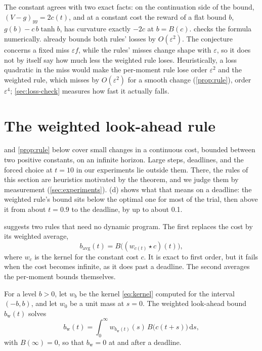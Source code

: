 \documentclass[11pt]{article}
\theoremstyle{definition}
\theoremstyle{remark}
\newcommand{\dd}{\,\mathrm{d}}
\begin{document}
The constant agrees with two exact facts: on the continuation side of the bound, $(V - g)_{yy} = 2c(t)$, and at a
constant cost the reward of a flat bound $b$, $g(b) - c\,b\tanh b$, has curvature exactly $-2c$ at
$b = B(c)$.  checks the formula numerically.  already bounds both rules' losses by $O(\varepsilon^2)$. The conjecture
concerns a fixed miss $\varepsilon f$, while the rules' misses change shape with $\varepsilon$, so
it does not by itself say how much less the weighted rule loses. Heuristically, a loss quadratic
in the miss would make the per-moment rule lose order $\varepsilon^2$ and the weighted rule, which
misses by $O(\varepsilon^2)$ for a smooth change (\cref{prop:rule}), order $\varepsilon^4$;
\cref{sec:loss-check} measures how fast it actually falls.

\section{The weighted look-ahead rule}
\label{sec:rule}

 and \cref{prop:rule} below cover small changes in a continuous cost, bounded
between two positive constants, on an infinite horizon. Large steps, deadlines, and the forced
choice at $t = 10$ in our experiments lie outside them. There, the rules of this section are
heuristics motivated by the theorem, and we judge them by measurement (\cref{sec:experiments}).
(d) shows what that means on a deadline: the weighted rule's bound sits below
the optimal one for most of the trial, then above it from about $t = 0.9$ to the deadline, by
up to about 0.1.

 suggests two rules that need no dynamic program. The first replaces the cost by
its weighted average,
\begin{equation}
  b_{\mathrm{avg}}(t) = B\bigl((w_{c(t)} \star c)(t)\bigr),
\end{equation}
where $w_c$ is the kernel for the constant cost $c$. It is exact to first order, but it fails
when the cost becomes infinite, as it does past a deadline. The second averages the per-moment
bounds themselves.

\begin{definition}
For a level $b > 0$, let $w_b$ be the kernel \eqref{eq:kernel} computed for the interval
$(-b, b)$, and let $w_0$ be a unit mass at $s = 0$. The weighted look-ahead bound $b_{\mathrm{w}}(t)$
solves
\begin{equation}
  b_{\mathrm{w}}(t) = \int_0^\infty w_{b_{\mathrm{w}}(t)}(s)\, B\bigl(c(t+s)\bigr)\dd s,
  \label{eq:weighted}
\end{equation}
with $B(\infty) = 0$, so that $b_{\mathrm{w}} = 0$ at and after a deadline.
\end{definition}
\end{document}

